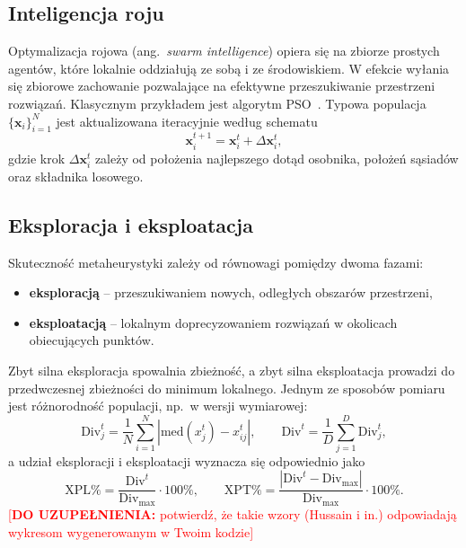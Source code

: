 \documentclass[12pt,a4paper]{article}
\newcommand{\todo}[1]{\textcolor{red}{[\textbf{DO UZUPEŁNIENIA:} #1]}}
\begin{document}
\subsection{Inteligencja roju}

Optymalizacja rojowa (ang.\ \textit{swarm intelligence}) opiera się na zbiorze
prostych agentów, które lokalnie oddziałują ze sobą i ze środowiskiem.
W efekcie wyłania się zbiorowe zachowanie pozwalające na efektywne przeszukiwanie
przestrzeni rozwiązań. Klasycznym przykładem jest algorytm PSO~\cite{kennedy1995}.
Typowa populacja $\{\mathbf{x}_i\}_{i=1}^{N}$ jest aktualizowana iteracyjnie według schematu
\begin{equation}
    \mathbf{x}_i^{t+1} = \mathbf{x}_i^{t} + \Delta\mathbf{x}_i^{t},
\end{equation}
gdzie krok $\Delta\mathbf{x}_i^{t}$ zależy od położenia najlepszego dotąd
osobnika, położeń sąsiadów oraz składnika losowego.

\subsection{Eksploracja i eksploatacja}

Skuteczność metaheurystyki zależy od równowagi pomiędzy dwoma fazami:
\begin{itemize}
    \item \textbf{eksploracją} -- przeszukiwaniem nowych, odległych obszarów przestrzeni,
    \item \textbf{eksploatacją} -- lokalnym doprecyzowaniem rozwiązań w okolicach
    obiecujących punktów.
\end{itemize}
Zbyt silna eksploracja spowalnia zbieżność, a zbyt silna eksploatacja prowadzi
do przedwczesnej zbieżności do minimum lokalnego. Jednym ze sposobów pomiaru jest
różnorodność populacji, np.\ w wersji wymiarowej:
\begin{equation}
    \mathrm{Div}_j^{t} = \frac{1}{N}\sum_{i=1}^{N}\left|\mathrm{med}(x_j^{t}) - x_{ij}^{t}\right|,
    \qquad
    \mathrm{Div}^{t} = \frac{1}{D}\sum_{j=1}^{D}\mathrm{Div}_j^{t},
\end{equation}
a udział eksploracji i eksploatacji wyznacza się odpowiednio jako
\begin{equation}
    \mathrm{XPL}\% = \frac{\mathrm{Div}^{t}}{\mathrm{Div}_{\max}}\cdot 100\%,
    \qquad
    \mathrm{XPT}\% = \frac{|\mathrm{Div}^{t}-\mathrm{Div}_{\max}|}{\mathrm{Div}_{\max}}\cdot 100\%.
\end{equation}
\todo{potwierdź, że takie wzory (Hussain i in.) odpowiadają wykresom wygenerowanym
w Twoim kodzie}
\end{document}
